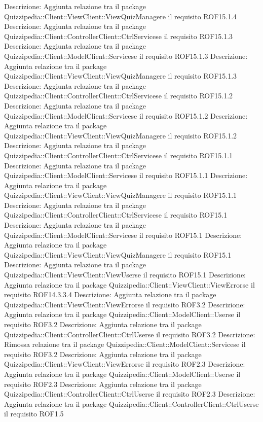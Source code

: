 Descrizione: Aggiunta relazione tra il package Quizzipedia::Client::ViewClient::ViewQuizManagere il requisito ROF15.1.4 
Descrizione: Aggiunta relazione tra il package Quizzipedia::Client::ControllerClient::CtrlServicese il requisito ROF15.1.3 
Descrizione: Aggiunta relazione tra il package Quizzipedia::Client::ModelClient::Servicese il requisito ROF15.1.3 
Descrizione: Aggiunta relazione tra il package Quizzipedia::Client::ViewClient::ViewQuizManagere il requisito ROF15.1.3 
Descrizione: Aggiunta relazione tra il package Quizzipedia::Client::ControllerClient::CtrlServicese il requisito ROF15.1.2 
Descrizione: Aggiunta relazione tra il package Quizzipedia::Client::ModelClient::Servicese il requisito ROF15.1.2 
Descrizione: Aggiunta relazione tra il package Quizzipedia::Client::ViewClient::ViewQuizManagere il requisito ROF15.1.2 
Descrizione: Aggiunta relazione tra il package Quizzipedia::Client::ControllerClient::CtrlServicese il requisito ROF15.1.1 
Descrizione: Aggiunta relazione tra il package Quizzipedia::Client::ModelClient::Servicese il requisito ROF15.1.1 
Descrizione: Aggiunta relazione tra il package Quizzipedia::Client::ViewClient::ViewQuizManagere il requisito ROF15.1.1 
Descrizione: Aggiunta relazione tra il package Quizzipedia::Client::ControllerClient::CtrlServicese il requisito ROF15.1 
Descrizione: Aggiunta relazione tra il package Quizzipedia::Client::ModelClient::Servicese il requisito ROF15.1 
Descrizione: Aggiunta relazione tra il package Quizzipedia::Client::ViewClient::ViewQuizManagere il requisito ROF15.1 
Descrizione: Aggiunta relazione tra il package Quizzipedia::Client::ViewClient::ViewUserse il requisito ROF15.1 
Descrizione: Aggiunta relazione tra il package Quizzipedia::Client::ViewClient::ViewErrorse il requisito ROF14.3.3.4 
Descrizione: Aggiunta relazione tra il package Quizzipedia::Client::ViewClient::ViewErrorse il requisito ROF3.2 
Descrizione: Aggiunta relazione tra il package Quizzipedia::Client::ModelClient::Userse il requisito ROF3.2 
Descrizione: Aggiunta relazione tra il package Quizzipedia::Client::ControllerClient::CtrlUserse il requisito ROF3.2 
Descrizione: Rimossa relazione tra il package Quizzipedia::Client::ModelClient::Servicese il requisito ROF3.2 
Descrizione: Aggiunta relazione tra il package Quizzipedia::Client::ViewClient::ViewErrorse il requisito ROF2.3 
Descrizione: Aggiunta relazione tra il package Quizzipedia::Client::ModelClient::Userse il requisito ROF2.3 
Descrizione: Aggiunta relazione tra il package Quizzipedia::Client::ControllerClient::CtrlUserse il requisito ROF2.3 
Descrizione: Aggiunta relazione tra il package Quizzipedia::Client::ControllerClient::CtrlUserse il requisito ROF1.5 
